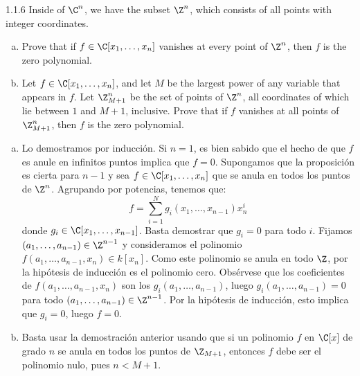 \documentclass[twoside]{article}
\begin{document}
\begin{ejercicio}{1.1.6}
Inside of $\C^n$, we have the subset $\Z^n$, which consists of all points with integer coordinates.
\begin{enumerate}[a.]
\item Prove that if $f \in \C[x_1,\dots,x_n]$ vanishes at every point of $\Z^n$, then $f$ is the zero polynomial.
\item Let $f \in \C[x_1,\dots,x_n]$, and let $M$ be the largest power of any variable that appears in $f$.
Let $\Z_{M+1}^n$ be the set of points of $\Z^n$, all coordinates of which lie between $1$ and $M+1$, inclusive.
Prove that if $f$ vanishes at all points of $\Z_{M+1}^n$, then $f$ is the zero polynomial.
\end{enumerate}
\end{ejercicio}
\begin{solucion}
\begin{enumerate}[a.]
\item Lo demostramos por inducción.
Si $n=1$, es bien sabido que el hecho de que $f$ es anule en infinitos puntos implica que $f=0$.
Supongamos que la proposición es cierta para $n-1$ y sea $f \in \C[x_1,\dots,x_n]$ que se anula en todos los puntos de $\Z^n$.
Agrupando por potencias, tenemos que:
\[ f = \sum_{i=1}^N g_i(x_1,\dots,x_{n-1})x_n^i \]
donde $g_i \in \C[x_1,\dots,x_{n-1}]$.
Basta demostrar que $g_i = 0$ para todo $i$.
Fijamos $(a_1,\dots,a_{n-1}) \in \Z^{n-1}$ y consideramos el polinomio $f(a_1,\dots,a_{n-1},x_n) \in k[x_n]$.
Como este polinomio se anula en todo $\Z$, por la hipótesis de inducción es el polinomio cero.
Obsérvese que los coeficientes de $f(a_1,\dots,a_{n-1},x_n)$ son los $g_i(a_1,\dots,a_{n-1})$, luego $g_i(a_1,\dots,a_{n-1})=0$ para todo $(a_1,\dots,a_{n-1})\in\Z^{n-1}$. 
Por la hipótesis de inducción, esto implica que $g_i = 0$, luego $f = 0$.

\item Basta usar la demostración anterior usando que si un polinomio $f$ en $\C[x]$ de grado $n$ se anula en todos los puntos de $\Z_{M+1}$, entonces $f$ debe ser el polinomio nulo, pues $n < M+1$.
\end{enumerate}
\end{solucion}
\end{document}
